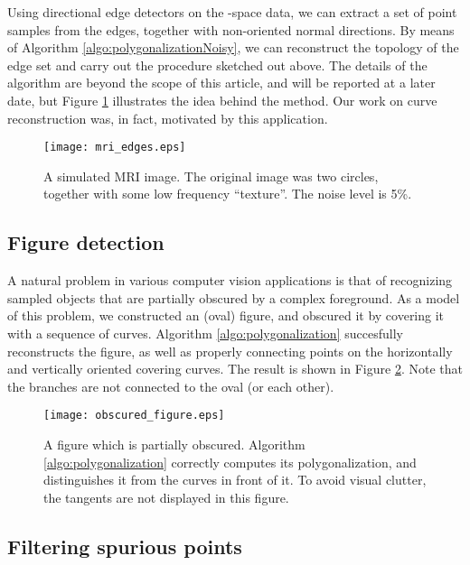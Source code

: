 \documentclass{article}
\numberwithin{cntr}{section}
\numberwithin{equation}{section}
\begin{document}
Using directional edge detectors on the -space data, we can extract
a set of point samples from the edges, together with non-oriented normal
directions.  By means of
Algorithm \ref{algo:polygonalizationNoisy}, we can
reconstruct the topology of the edge set and carry out the
procedure sketched out above.
The details of the algorithm are beyond the scope of this article,
and will be reported at a later date,
but Figure \ref{fig:mriExample}
illustrates the idea behind the method. Our work on curve reconstruction was,
in fact, motivated by this application.

\begin{figure}
\setlength{\unitlength}{0.240900pt}
\ifx\plotpoint\undefined\newsavebox{\plotpoint}\fi
\sbox{\plotpoint}{\rule[-0.200pt]{0.400pt}{0.400pt}}\texttt{[image: mri\_edges.eps]}
\caption{A simulated MRI image. The original image was two circles, together with some low frequency ``texture''. The noise level is 5\%.}
\label{fig:mriExample}
\end{figure}

\subsection{Figure detection}

A natural problem in various computer vision applications is that of
recognizing sampled objects that are partially obscured by a
complex foreground.
As a model of this problem, we constructed an (oval)
figure, and obscured it by covering it with a sequence of curves.
Algorithm \ref{algo:polygonalization} succesfully reconstructs the
figure, as well as properly connecting points on the
horizontally and vertically oriented covering curves.
The result is shown in
Figure \ref{fig:obscuredExample}. Note that the branches are not
connected to the oval (or each other).

\begin{figure}
\setlength{\unitlength}{0.240900pt}
\ifx\plotpoint\undefined\newsavebox{\plotpoint}\fi
\sbox{\plotpoint}{\rule[-0.200pt]{0.400pt}{0.400pt}}\texttt{[image: obscured\_figure.eps]}
\caption{A figure which is partially obscured.
Algorithm \ref{algo:polygonalization} correctly computes its
polygonalization, and distinguishes it from the curves in front of it.
To avoid visual clutter, the tangents are not displayed in this figure.}
\label{fig:obscuredExample}
\end{figure}

\subsection{Filtering spurious points}
\end{document}
